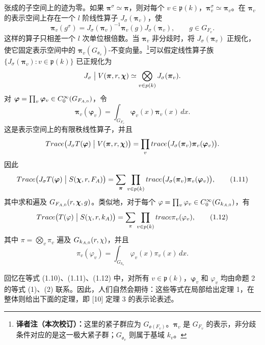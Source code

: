 张成的子空间上的迹为零。如果 $\boldsymbol\pi^\sigma\simeq\boldsymbol\pi$，则对每个 $v\in\mathfrak p(k)$，$\boldsymbol\pi_v^\sigma\simeq\boldsymbol\pi_v$。在 $\boldsymbol\pi_v$ 的表示空间上存在一个 $l$ 阶线性算子 $J_\sigma(\boldsymbol\pi_v)$，使
\[
 \boldsymbol\pi_v(g^\sigma)=J_\sigma(\boldsymbol\pi_v)^{-1}
 \boldsymbol\pi_v(g)J_\sigma(\boldsymbol\pi_v),\qquad g\in G_{F_v}.
\]
这样的算子只相差一个 $l$ 次单位根倍数。当 $\boldsymbol\pi_v$ 非分歧时，将 $J_\sigma(\boldsymbol\pi_v)$ 正规化，使它固定表示空间中的 $\boldsymbol\pi_v(G_{\mathfrak o_v})$-不变向量。\footnote{\textbf{译者注（本次校订）：}这里的紧子群应为 $G_{\mathfrak o(F_v)}$。$\boldsymbol\pi_v$ 是 $G_{F_v}$ 的表示，非分歧条件对应的是这一极大紧子群；$G_{\mathfrak o_v}$ 则属于基域 $k_v$。}可以假定线性算子族 $\{J_\sigma(\boldsymbol\pi_v):v\in\mathfrak p(k)\}$ 已正规化为
\[
 J_\sigma\bigm|V(\boldsymbol\pi,r,\boldsymbol\chi)
 \simeq\bigotimes_{v\in\mathfrak p(k)}J_\sigma(\boldsymbol\pi_v).
\]
对 $\boldsymbol\varphi=\prod_v\boldsymbol\varphi_v\in C_0^\infty(G_{F_{\A,0}})$，令
\[
 \boldsymbol\pi_v(\boldsymbol\varphi_v)
 =\int_{G_{F_v}}\boldsymbol\varphi_v(x)\boldsymbol\pi_v(x)\,dx.
\]
这是表示空间上的有限秩线性算子，并且
\[
 \operatorname{Trace}\bigl(J_\sigma T(\boldsymbol\varphi)
 \bigm|V(\boldsymbol\pi,r,\boldsymbol\chi)\bigr)
 =\prod_v\operatorname{trace}\bigl(J_\sigma(\boldsymbol\pi_v)
 \boldsymbol\pi_v(\boldsymbol\varphi_v)\bigr).
\]
因此
\begin{equation}
 \operatorname{Trace}\bigl(J_\sigma T(\boldsymbol\varphi)
 \bigm|S(\boldsymbol\chi,r,F_\A)\bigr)
 =\sum_{\boldsymbol\pi}\prod_{v\in\mathfrak p(k)}
 \operatorname{trace}\bigl(J_\sigma(\boldsymbol\pi_v)
 \boldsymbol\pi_v(\boldsymbol\varphi_v)\bigr),
 \tag{1.11}
\end{equation}
其中求和遍及 $\widehat G_{F_{\A,0}}(r,\boldsymbol\chi,\mathfrak g)$。类似地，对于每个 $\varphi=\prod_v\varphi_v\in C_0^\infty(G_{k_{\A,0}})$，有
\begin{equation}
 \operatorname{Trace}\bigl(T(\varphi)\bigm|S(\chi,r,k_\A)\bigr)
 =\sum_\pi\prod_{v\in\mathfrak p(k)}\operatorname{trace}\pi_v(\varphi_v),
 \tag{1.12}
\end{equation}
其中 $\pi=\bigotimes_v\pi_v$ 遍及 $\widehat G_{k_{\A,0}}(r,\chi)$，并且
\[
 \pi_v(\varphi_v)=\int_{G_{k_v}}\varphi_v(x)\pi_v(x)\,dx.
\]

回忆在等式 (1.10)、(1.11)、(1.12) 中，对所有 $v\in\mathfrak p(k)$，$\boldsymbol\varphi_v$ 和 $\varphi_v$ 均由命题 2 的等式 (1)、(2) 联系。因此，人们自然会期待：这些等式在局部给出定理 1，在整体则给出下面的定理，即 [10] 定理 3 的表示论表述。

